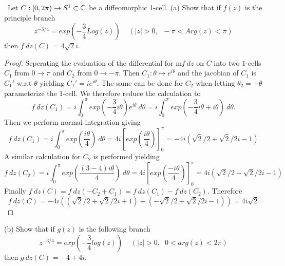 \documentclass[11pt]{amsart}
\theoremstyle{definition}
\numberwithin{theorem}{section}
\numberwithin{definition}{section}
\numberwithin{equation}{section}
\def\complex{{\mathbb C}\/}
\begin{document}
\medskip {}\ Let $C: [0, 2\pi) \to S^1 \subset\complex$ be a diffeomorphic 1-cell. 
\newline \noindent (a) Show that if $f(z)$ is the principle branch
\begin{equation*}
	z^{-3/4} = exp\left(-\frac{3}{4} Log(z)\right)\;\;\;\; (|z| >0,\;\;-\pi < Arg(z) < \pi)
\end{equation*}
then $f\ dz(C)$ = $4\sqrt{2}i$.
\begin{proof}
	Seperating the evaluation of the differential for m$f\ dz$ on $C$ into two $1$-cells $C_1$ from $0 \to \pi$
	and $C_2$ from $0 \to - \pi$. Then $C_1 : \theta \mapsto e^{i\theta}$ and the jacobian of $C_1$ is $C_1'$ w.r.t $\theta$ yielding $C_1' = ie^{i\theta}$. The same can be done for $C_2$ when letting $\theta_2 = -\theta$ parameterize the $1$-cell. We therefore reduce the calculation to
	\begin{equation*}
		f\ dz(C_1) =  i\int_0^\pi  exp\left(-\frac{3}{4} i\theta \right) e^{i\theta}\ d\theta =
		 i\int_0^\pi  exp\left(-\frac{3}{4} i\theta  + i\theta\right)\ d\theta .
	\end{equation*}
	Then we perform normal integration giving
	\begin{equation*}
		f\ dz(C_1) = i\int_0^\pi exp\left(\frac{i\theta}{4}\right)\ d\theta  = 4i \left[exp\left(\frac{i\theta}{4}\right)\right]_0^\pi = -4i(\sqrt{2}/2 + \sqrt{2}/2i - 1)
	\end{equation*}
	A similar calculation for $C_2$ is performed yielding
	\begin{equation*}
		f\ dz(C_2) = i\int_0^\pi exp\left(\frac{(3-4)i\theta}{4} \right)\ d\theta  = 4i \left[exp\left(\frac{-i\theta}{4}\right)\right]_0^\pi =   4i(\sqrt{2}/2 - \sqrt{2}/2i - 1)
	\end{equation*}
	Finally $f\ dz(C) = f\ dz(-C_2 + C_1) = f\ dz(C_1) - f\ dz(C_2).$ Therefore
	\begin{equation*}
		f\ dz(C) = -4i((\sqrt{2}/2 + \sqrt{2}/2i + 1) + (-\sqrt{2}/2 + \sqrt{2}/2i - 1)) = 4i\sqrt{2}
	\end{equation*}
\end{proof}
\noindent (b) Show that if $g(z)$ is the following branch
\begin{equation*}
	z^{-3/4} = exp\left(-\frac{3}{4} log(z)\right)\;\;\;\; (|z| >0,\;\;0 < arg(z) < 2\pi)
\end{equation*}
then $g\ dz(C)$ = $-4 + 4i$.
\end{document}
